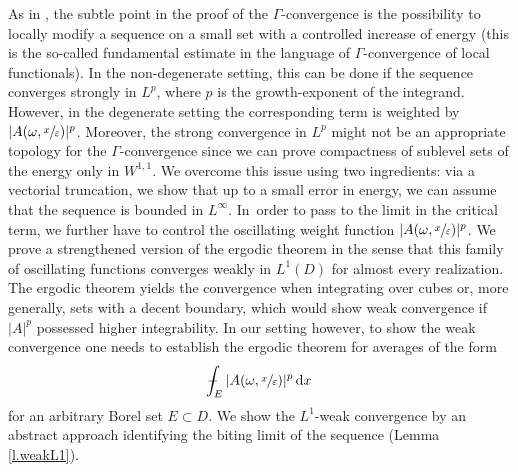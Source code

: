 \documentclass[JEP,XML,SOM,Unicode,published]{cedram}
\theoremstyle{definition}
\def\Xint#1{\mathchoice
{\XXint\displaystyle\textstyle{#1}}%
{\XXint\textstyle\scriptstyle{#1}}%
{\XXint\scriptstyle\scriptscriptstyle{#1}}%
{\XXint\scriptscriptstyle\scriptscriptstyle{#1}}%
\!\int}
\def\XXint#1#2#3{{\setbox0=\hbox{$#1{#2#3}{\int}$ }
\vcenter{\hbox{$#2#3$ }}\kern-.57\wd0}}
\def\dashint{\Xint-}
\let\e\varepsilon
\let\w\omega
\newcommand{\dx}{\,\mathrm{d}x}
\begin{document}
As in \cite{NSS}, the subtle point in the proof of the $\Gamma$-convergence is the possibility to locally modify a sequence on a small set with a controlled increase of energy (this is the so-called fundamental estimate in the language of $\Gamma$-convergence of local functionals). In the non-degenerate setting, this can be done if the sequence converges strongly in $L^p$, where $p$ is the growth-exponent of the integrand. However, in the degenerate setting the corresponding term is weighted by $|A(\w,\sfrac{x}{\e})|^p$. Moreover, the strong convergence in $L^p$ might not be an appropriate topology for the $\Gamma$-convergence since we can prove compactness of sublevel sets of the energy only in $W^{1,1}$. We overcome this issue using two ingredients: via a vectorial truncation, we show that up to a small error in energy, we can assume that the sequence is bounded in $L^{\infty}$. In~order to pass to the limit in the critical term, we further have to control the oscillating weight function $|A(\w,\sfrac{x}{\e})|^p$. We prove a strengthened version of the ergodic theorem in the sense that this family of oscillating functions converges weakly in $L^1(D)$ for almost every realization. The ergodic theorem yields the convergence when integrating over cubes or, more generally, sets with a decent boundary, which would show weak convergence if $|A|^p$ possessed higher integrability. In our setting however, to show the weak convergence one needs to establish the ergodic theorem for averages of the form
\begin{equation*}
\dashint_E |A(\w,\sfrac{x}{\e})|^p\dx
\end{equation*}
for an arbitrary Borel set $E\subset D$. We show the $L^1$-weak convergence by an abstract approach identifying the biting limit of the sequence (\cf Lemma \ref{l.weakL1}).
\end{document}
